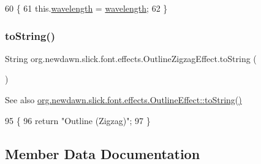 \begin{DoxyCode}
60                                                 \{
61         this.\mbox{\hyperlink{classorg_1_1newdawn_1_1slick_1_1font_1_1effects_1_1_outline_zigzag_effect_a4393ec4437b469ea2855c70deec82d09}{wavelength}} = \mbox{\hyperlink{classorg_1_1newdawn_1_1slick_1_1font_1_1effects_1_1_outline_zigzag_effect_a4393ec4437b469ea2855c70deec82d09}{wavelength}};
62     \}
\end{DoxyCode}
\mbox{\label{classorg_1_1newdawn_1_1slick_1_1font_1_1effects_1_1_outline_zigzag_effect_a7983dba9c0d32b64cff8aac03437aba9}} 
\subsubsection{\texorpdfstring{to\+String()}{toString()}}
{\footnotesize\ttfamily String org.\+newdawn.\+slick.\+font.\+effects.\+Outline\+Zigzag\+Effect.\+to\+String (\begin{DoxyParamCaption}{ }\end{DoxyParamCaption})\hspace{0.3cm}{\ttfamily [inline]}}

\begin{DoxySeeAlso}{See also}
\mbox{\hyperlink{classorg_1_1newdawn_1_1slick_1_1font_1_1effects_1_1_outline_effect_af0c4f7e4ee8cf7282bf1521f8647185c}{org.\+newdawn.\+slick.\+font.\+effects.\+Outline\+Effect\+::to\+String()}} 
\end{DoxySeeAlso}

\begin{DoxyCode}
95                               \{
96         \textcolor{keywordflow}{return} \textcolor{stringliteral}{"Outline (Zigzag)"};
97     \}
\end{DoxyCode}


\subsection{Member Data Documentation}
\mbox{\label{classorg_1_1newdawn_1_1slick_1_1font_1_1effects_1_1_outline_zigzag_effect_a26543e6243bf5e4fb7486d7a7674ed1c}} 
